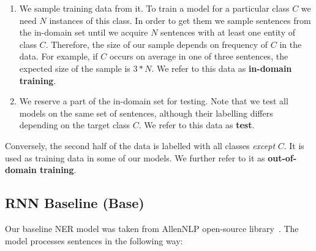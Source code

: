 \begin{enumerate}
	\item We sample training data from it. To train a model for a particular class $C$ we need $N$ instances of this class. In order to get them we sample sentences from the in-domain set until we acquire $N$ sentences with at least one entity of class $C$. Therefore, the size of our sample depends on frequency of $C$ in the data. For example, if $C$ occurs on average in one of three sentences, the expected size of the sample is $3*N$. We refer to this data as \textbf{in-domain training}.
    \item We reserve a part of the in-domain set for testing. Note that we test all models on the same set of sentences, although their labelling differs depending on the target class $C$. We refer to this data as \textbf{test}.
\end{enumerate}

Conversely, the second half of the data is labelled with all classes \textit{except} $C$. It is used as training data in some of our models. We further refer to it as \textbf{out-of-domain training}.

\subsection{RNN Baseline (Base)}
Our baseline NER model was taken from AllenNLP open-source library~\cite{allen}. The model processes sentences in the following way:

